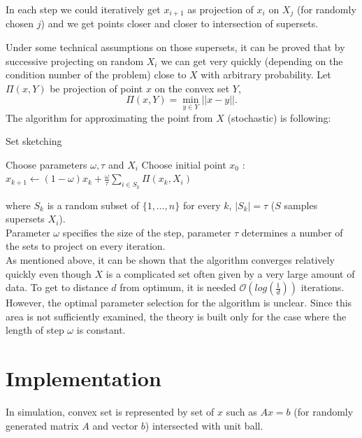 \documentclass[11pt]{book}
\begin{document}
In each step we could iteratively get $x_{i+1}$ as projection of $x_i$ on $X_j$ (for randomly chosen $j$) and we get points closer and closer to intersection of supersets.

Under some technical assumptions on those supersets, it can be proved that by successive projecting on random $X_i$ we can get very quickly (depending on the condition number of the problem) close to $X$ with arbitrary probability. Let $\Pi(x, Y)$ be projection of point $x$ on the convex set $Y$, $$\Pi(x,Y) = \min_{y \in Y} ||x-y||.$$ The algorithm for approximating the point from $X$ (stochastic) is following:

\begin{algorithm}[H]
	\caption{Set sketching \cite{projectionFeasibility}\cite{kaczmarz}}
	\label{alg:set sketch}
	\begin{algorithmic}[1]
		\State Choose parameters $\omega, \tau$ and $ X_i$
		\State Choose initial point $x_0$
		:
		\State $x_{k+1} \leftarrow (1 - \omega)x_k + \frac{\omega}{\tau}\sum_{i \in S_k} \Pi(x_k, X_i )$
		\EndFor
	\end{algorithmic}
\end{algorithm}

\noindent
where $S_k$ is a random subset of $\{ 1, \dots , n\}$ for every $k$, $|S_k|=\tau$ ($S$ samples supersets $X_i$).\\

Parameter $\omega$ specifies the size of the step, parameter $\tau$ determines a number of the sets to project on every iteration.\\

As mentioned above, it can be shown that the algorithm converges relatively quickly even though $X$ is a complicated set often given by a very large amount of data. To get to distance $d$ from optimum, it is needed $\mathcal{O} (log(\frac{1}{d}))$ iterations\cite{sketchAndProject}\cite{kaczmarz}.  However, the optimal parameter selection for the algorithm is unclear. Since this area is not sufficiently examined, the theory is built only for the case where the length of step $\omega$ is constant.\\

\section{Implementation}

In simulation, convex set is represented by set of $x$ such as $Ax=b$ (for randomly generated matrix $A$ and vector $b$) intersected with unit ball.
\end{document}
